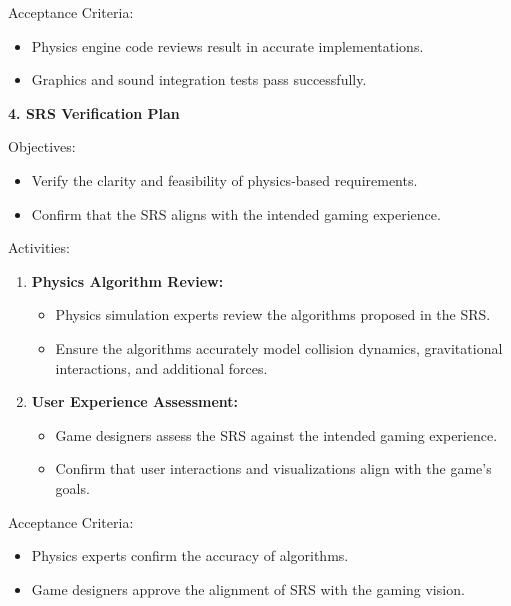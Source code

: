 \documentclass[
]{article}
\begin{document}
Acceptance Criteria:

\begin{itemize}
\item
  Physics engine code reviews result in accurate implementations.
\item
  Graphics and sound integration tests pass successfully.
\end{itemize}

\textbf{4. SRS Verification Plan}

Objectives:

\begin{itemize}
\item
  Verify the clarity and feasibility of physics-based requirements.
\item
  Confirm that the SRS aligns with the intended gaming experience.
\end{itemize}

Activities:

\begin{enumerate}
\def\labelenumi{\arabic{enumi}.}
\item
  \textbf{Physics Algorithm Review:}

  \begin{itemize}
  \item
    Physics simulation experts review the algorithms proposed in the
    SRS.
  \item
    Ensure the algorithms accurately model collision dynamics,
    gravitational interactions, and additional forces.
  \end{itemize}
\item
  \textbf{User Experience Assessment:}

  \begin{itemize}
  \item
    Game designers assess the SRS against the intended gaming
    experience.
  \item
    Confirm that user interactions and visualizations align with the
    game's goals.
  \end{itemize}
\end{enumerate}

Acceptance Criteria:

\begin{itemize}
\item
  Physics experts confirm the accuracy of algorithms.
\item
  Game designers approve the alignment of SRS with the gaming vision.
\end{itemize}
\end{document}
